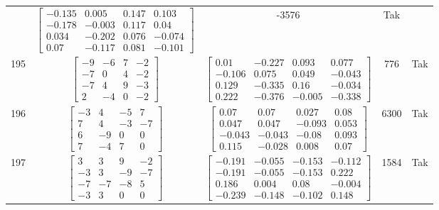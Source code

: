 \documentclass[a4paper,12pt]{article}
\begin{document}
\begin{tabular}{c c c c c}
&
$\begin{bmatrix} -0.135 & 0.005 & 0.147 & 0.103 \\ -0.178 & -0.003 & 0.117 & 0.04 \\ 0.034 & -0.202 & 0.076 & -0.074 \\ 0.07 & -0.117 & 0.081 & -0.101 \end{bmatrix}$
&
-3576
&
Tak
\\
195
&
$\begin{bmatrix} -9 & -6 & 7 & -2 \\ -7 & 0 & 4 & -2 \\ -7 & 4 & 9 & -3 \\ 2 & -4 & 0 & -2 \end{bmatrix}$
&
$\begin{bmatrix} 0.01 & -0.227 & 0.093 & 0.077 \\ -0.106 & 0.075 & 0.049 & -0.043 \\ 0.129 & -0.335 & 0.16 & -0.034 \\ 0.222 & -0.376 & -0.005 & -0.338 \end{bmatrix}$
&
776
&
Tak
\\
196
&
$\begin{bmatrix} -3 & 4 & -5 & 7 \\ 7 & 4 & -3 & -7 \\ 6 & -9 & 0 & 0 \\ 7 & -4 & 7 & 0 \end{bmatrix}$
&
$\begin{bmatrix} 0.07 & 0.07 & 0.027 & 0.08 \\ 0.047 & 0.047 & -0.093 & 0.053 \\ -0.043 & -0.043 & -0.08 & 0.093 \\ 0.115 & -0.028 & 0.008 & 0.07 \end{bmatrix}$
&
6300
&
Tak
\\
197
&
$\begin{bmatrix} 3 & 3 & 9 & -2 \\ -3 & 3 & -9 & -7 \\ -7 & -7 & -8 & 5 \\ -3 & 3 & 0 & 0 \end{bmatrix}$
&
$\begin{bmatrix} -0.191 & -0.055 & -0.153 & -0.112 \\ -0.191 & -0.055 & -0.153 & 0.222 \\ 0.186 & 0.004 & 0.08 & -0.004 \\ -0.239 & -0.148 & -0.102 & 0.148 \end{bmatrix}$
&
1584
&
Tak
\\

\end{tabular}
\end{document}
